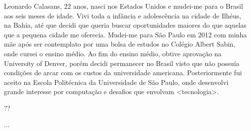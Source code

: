 \documentclass[11pt, a4paper]{awesome-cv} %
\begin{document}
\makecvheader %



\begin{cvletter}



Leonardo Calasans, 22 anos, nasci nos Estados Unidos e mudei-me para o Brasil aos seis meses de idade. Vivi toda a infância e adolescência na cidade de Ilhéus, na Bahia, até que
decidi que queria buscar oportunidades maiores do que aquelas que a pequena cidade me oferecia. Mudei-me para São Paulo em 2012 com minha mãe após ser contemplato por uma bolsa de estudos no Colégio Albert Sabin, onde cursei o ensino médio. Ao fim do ensino médio, obtive aprovação na University of Denver, porém decidi permanecer no Brasil visto que não
possuía condições de arcar com os custos da universidade americana. Posteriormente fui aceito na Escola Politécnica da Universidade de São Paulo, onde desenvolvi grande interesse
por computação e desafios que envolvam <tecnologia>.



??



...


\end{cvletter}


\makeletterclosing %
\end{document}
